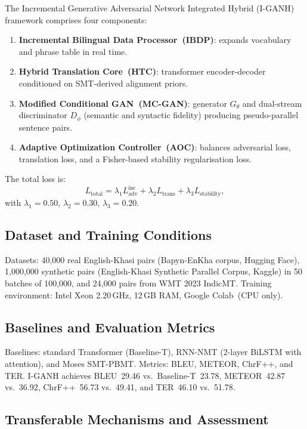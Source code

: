 \documentclass[11pt,a4paper]{article}
\begin{document}
The Incremental Generative Adversarial Network Integrated Hybrid
(I-GANH) framework comprises four components:
\begin{enumerate}
  \item \textbf{Incremental Bilingual Data Processor~(IBDP)}: expands
        vocabulary and phrase table in real time.
  \item \textbf{Hybrid Translation Core~(HTC)}: transformer
        encoder-decoder conditioned on SMT-derived alignment priors.
  \item \textbf{Modified Conditional GAN~(MC-GAN)}: generator
        $G_\theta$ and dual-stream discriminator $D_\phi$ (semantic and
        syntactic fidelity) producing pseudo-parallel sentence pairs.
  \item \textbf{Adaptive Optimization Controller~(AOC)}: balances
        adversarial loss, translation loss, and a Fisher-based
        stability regularisation loss.
\end{enumerate}
The total loss is:
\begin{equation}
  L_{\text{total}} = \lambda_1 L_{\text{adv}}^{\text{inc}} +
                     \lambda_2 L_{\text{trans}} +
                     \lambda_3 L_{\text{stability}},
  \label{eq:iganhTotal}
\end{equation}
with $\lambda_1=0.50$, $\lambda_2=0.30$, $\lambda_3=0.20$.

\subsection{Dataset and Training Conditions}

Datasets: 40,000 real English-Khasi pairs (Bapyn-EnKha corpus, Hugging
Face), 1,000,000 synthetic pairs (English-Khasi Synthetic Parallel
Corpus, Kaggle) in 50 batches of 100,000, and 24,000 pairs from WMT
2023 IndicMT.  Training environment: Intel Xeon 2.20\,GHz, 12\,GB RAM,
Google Colab~(CPU only).

\subsection{Baselines and Evaluation Metrics}

Baselines: standard Transformer (Baseline-T), RNN-NMT (2-layer BiLSTM
with attention), and Moses SMT-PBMT.  Metrics: BLEU, METEOR, ChrF++,
and TER.  I-GANH achieves BLEU~29.46 vs.\ Baseline-T~23.78,
METEOR~42.87 vs.\ 36.92, ChrF++~56.73 vs.\ 49.41, and TER~46.10
vs.\ 51.78.

\subsection{Transferable Mechanisms and Assessment}
\end{document}
